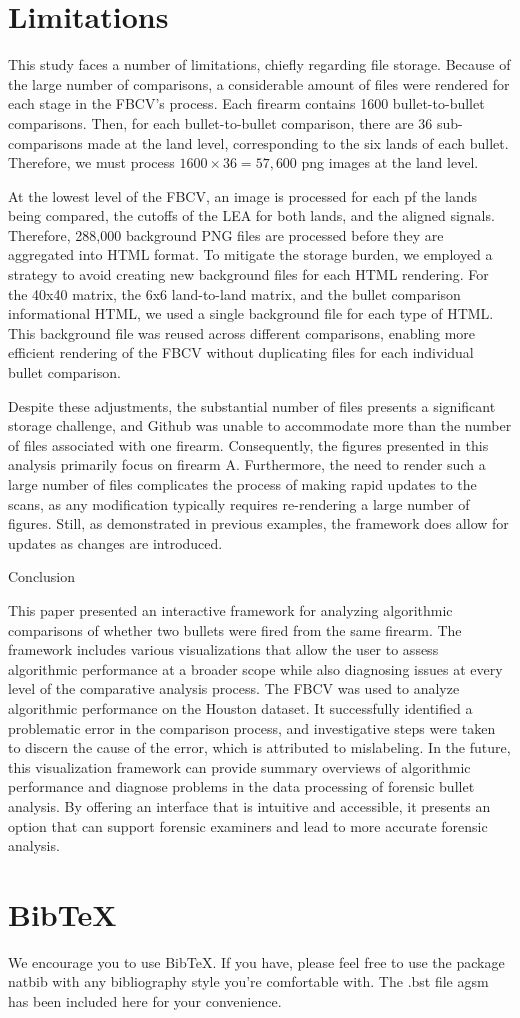 \documentclass[
  12pt]{article}
\begin{document}
\section{Limitations}\label{limitations}

This study faces a number of limitations, chiefly regarding file
storage. Because of the large number of comparisons, a considerable
amount of files were rendered for each stage in the FBCV's process. Each
firearm contains 1600 bullet-to-bullet comparisons. Then, for each
bullet-to-bullet comparison, there are 36 sub-comparisons made at the
land level, corresponding to the six lands of each bullet. Therefore, we
must process \(1600 \times 36 = 57,600\) png images at the land level.

At the lowest level of the FBCV, an image is processed for each pf the
lands being compared, the cutoffs of the LEA for both lands, and the
aligned signals. Therefore, 288,000 background PNG files are processed
before they are aggregated into HTML format. To mitigate the storage
burden, we employed a strategy to avoid creating new background files
for each HTML rendering. For the 40x40 matrix, the 6x6 land-to-land
matrix, and the bullet comparison informational HTML, we used a single
background file for each type of HTML. This background file was reused
across different comparisons, enabling more efficient rendering of the
FBCV without duplicating files for each individual bullet comparison.

Despite these adjustments, the substantial number of files presents a
significant storage challenge, and Github was unable to accommodate more
than the number of files associated with one firearm. Consequently, the
figures presented in this analysis primarily focus on firearm A.
Furthermore, the need to render such a large number of files complicates
the process of making rapid updates to the scans, as any modification
typically requires re-rendering a large number of figures. Still, as
demonstrated in previous examples, the framework does allow for updates
as changes are introduced.

Conclusion

This paper presented an interactive framework for analyzing algorithmic
comparisons of whether two bullets were fired from the same firearm. The
framework includes various visualizations that allow the user to assess
algorithmic performance at a broader scope while also diagnosing issues
at every level of the comparative analysis process. The FBCV was used to
analyze algorithmic performance on the Houston dataset. It successfully
identified a problematic error in the comparison process, and
investigative steps were taken to discern the cause of the error, which
is attributed to mislabeling. In the future, this visualization
framework can provide summary overviews of algorithmic performance and
diagnose problems in the data processing of forensic bullet analysis. By
offering an interface that is intuitive and accessible, it presents an
option that can support forensic examiners and lead to more accurate
forensic analysis.

\section{BibTeX}\label{bibtex}

We encourage you to use BibTeX. If you have, please feel free to use the
package natbib with any bibliography style you're comfortable with. The
.bst file agsm has been included here for your convenience.


  
\end{document}
